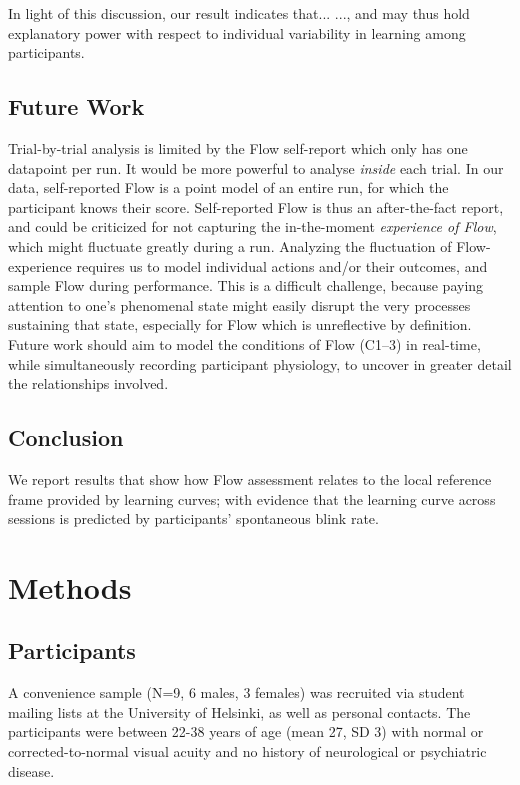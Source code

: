 \documentclass[fleqn,10pt]{wlscirep}
\begin{document}
In light of this discussion, our result indicates that...
..., and may thus hold explanatory power with respect to individual variability in learning among participants.%


\subsection*{Future Work}
Trial-by-trial analysis is limited by the Flow self-report which only has one datapoint per run. It would be more powerful to analyse {\it inside} each trial. In our data, self-reported Flow is a point model of an entire run, for which the participant knows their score. Self-reported Flow is thus an after-the-fact report, and could be criticized for not capturing the in-the-moment {\it experience of Flow}, which might fluctuate greatly during a run. Analyzing the fluctuation of Flow-experience requires us to model individual actions and/or their outcomes, and sample Flow during performance. This is a difficult challenge, because paying attention to one's phenomenal state might easily disrupt the very processes sustaining that state, especially for Flow which is unreflective by definition. Future work should aim to model the conditions of Flow ({\sf C1--3}) in real-time, while simultaneously recording participant physiology, to uncover in greater detail the relationships involved.


\subsection*{Conclusion}

We report results that show how Flow assessment relates to the local reference frame provided by learning curves; with evidence that the learning curve across sessions is predicted by participants' spontaneous blink rate.


\section*{Methods}

\subsection*{Participants}
A convenience sample (N=9, 6 males, 3 females) was recruited via student mailing lists at the University of Helsinki, as well as personal contacts. The participants were between 22-38 years of age (mean 27, SD 3) with normal or corrected-to-normal visual acuity and no history of neurological or psychiatric disease.
\end{document}
